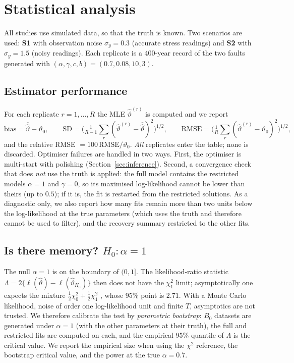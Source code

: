 \documentclass[11pt,a4paper]{article}
\begin{document}
\section{Statistical analysis}\label{sec:stats}
All studies use simulated data, so that the truth is known. Two scenarios are used: \textbf{S1} with observation noise $\sigma_y=0.3$ (accurate stress readings) and \textbf{S2} with $\sigma_y=1.5$ (noisy readings). Each replicate is a 400-year record of the two faults generated with $(\alpha,\gamma,c,b)=(0.7,0.08,10,3)$.

\subsection{Estimator performance}
For each replicate $r=1,\dots,R$ the MLE $\hat\vartheta^{(r)}$ is computed and we report
\[
\mathrm{bias}=\overline{\hat\vartheta}-\vartheta_0,\qquad \mathrm{SD}=\Big(\tfrac{1}{R-1}\sum_r(\hat\vartheta^{(r)}-\overline{\hat\vartheta})^2\Big)^{1/2},\qquad \mathrm{RMSE}=\Big(\tfrac1R\sum_r(\hat\vartheta^{(r)}-\vartheta_0)^2\Big)^{1/2},
\]
and the relative RMSE $=100\,\mathrm{RMSE}/\vartheta_0$. \emph{All} replicates enter the table; none is discarded. Optimiser failures are handled in two ways. First, the optimiser is multi-start with polishing (Section~\ref{sec:inference}). Second, a convergence check that does \emph{not} use the truth is applied: the full model contains the restricted models $\alpha=1$ and $\gamma=0$, so its maximised log-likelihood cannot be lower than theirs (up to $0.5$); if it is, the fit is restarted from the restricted solutions. As a diagnostic only, we also report how many fits remain more than two units below the log-likelihood at the true parameters (which uses the truth and therefore cannot be used to filter), and the recovery summary restricted to the other fits.

\subsection{Is there memory? $H_0:\alpha=1$}
The null $\alpha=1$ is on the boundary of $(0,1]$. The likelihood-ratio statistic $\Lambda=2\{\ell(\hat\vartheta)-\ell(\hat\vartheta_{H_0})\}$ then does not have the $\chi^2_1$ limit; asymptotically one expects the mixture $\tfrac12\chi^2_0+\tfrac12\chi^2_1$ \citep{Chernoff1954,SelfLiang1987}, whose 95\% point is $2.71$. With a Monte Carlo likelihood, noise of order one log-likelihood unit and finite $T$, asymptotics are not trusted. We therefore calibrate the test by \emph{parametric bootstrap}: $B_0$ datasets are generated under $\alpha=1$ (with the other parameters at their truth), the full and restricted fits are computed on each, and the empirical 95\% quantile of $\Lambda$ is the critical value. We report the empirical size when using the $\chi^2$ reference, the bootstrap critical value, and the power at the true $\alpha=0.7$.
\end{document}
